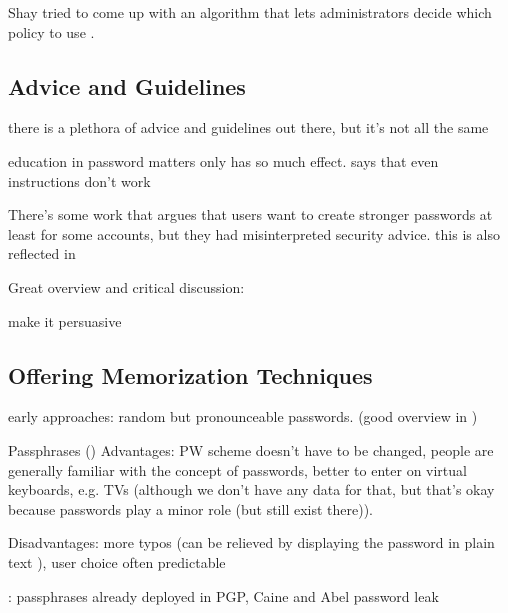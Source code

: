 	
	Shay tried to come up with an algorithm that lets administrators decide which policy to use \cite{Shay2009PolicySimulation}.
	
	

	\subsection{Advice and Guidelines}
	
	there is a plethora of advice and guidelines out there, but it's not all the same 
	
	education in password matters only has so much effect. 
	\cite{Forget2007HelpingUsers} says that even instructions don't work
	
	There's some work that argues that users want to create stronger passwords at least for some accounts, but they had
	misinterpreted security advice. 
	this is also reflected in \cite{Ur2016PerceptionsPassword}
	
	Great overview and critical discussion: \cite{ZhangKennedy2016RevisitingPasswordRules}
	
	
	make it persuasive \cite{Zakaria2013DesigningEffectiveSecurityMessages}
	
	
		
	
	\subsection{Offering Memorization Techniques}
	
	
	early approaches: random but pronounceable passwords. (good overview in \cite{Kuo2006HumanSelectionMnemonic})
	
	\cite{Bonneau2014ReliableStorage56Bits}
	\cite{Forget2007HelpingUsers}
	
	Passphrases ()
	Advantages: PW scheme doesn't have to be changed, people are generally familiar with the concept of passwords, better to enter on virtual keyboards, e.g. TVs (although we don't have any data for that, but that's okay because passwords play a minor role (but still exist there)).
	
	Disadvantages: more typos (can be relieved by displaying the password in plain text  \cite{Melicher2016UsabilityMobileTextPasswords}), user choice often predictable
	
	\cite{Bonneau2012LinguisticProperties}: passphrases already deployed in PGP, Caine and Abel password leak \cite{Carnavalet2014AnalyzingPWStrengthMeters} 
	
